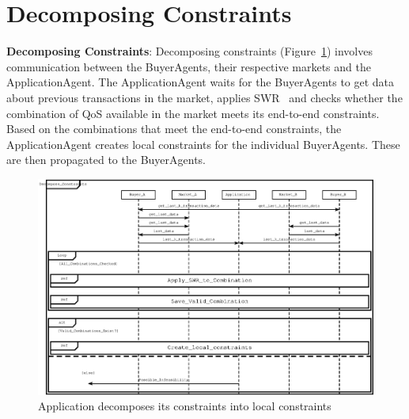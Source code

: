 \documentclass[10pt,journal,compsoc]{IEEEtran}
\begin{document}
\appendix 
\section{Decomposing Constraints}\label{auml_appendix}
\textbf{Decomposing Constraints}: Decomposing constraints (Figure~\ref{fig:decompose_constraints}) involves communication between the BuyerAgents, their respective markets and the ApplicationAgent. The ApplicationAgent waits for the BuyerAgents to get data about previous transactions in the market, applies SWR~\cite{Cardoso2002Workflow} and checks whether the combination of QoS available in the market meets its end-to-end constraints. Based on the combinations that meet the end-to-end constraints, the ApplicationAgent creates local constraints for the individual BuyerAgents. These are then propagated to the BuyerAgents.

\begin{figure}[h]
\centering
\includegraphics[scale=0.7]{Figure24.eps}
\caption{Application decomposes its constraints into local constraints \label{fig:decompose_constraints}}
\end{figure}
\end{document}
